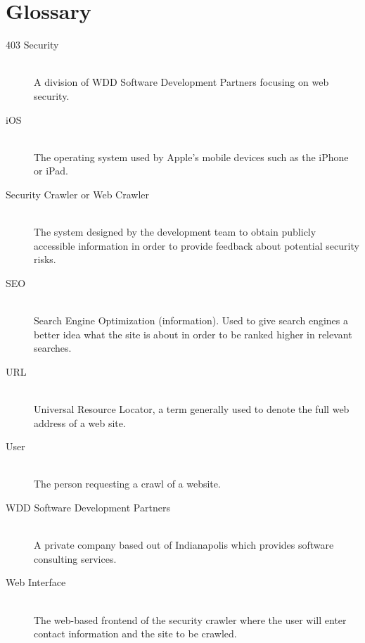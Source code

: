 \section{Glossary}
\begin{description}
    \item[403 Security] \hfill \\
        A division of WDD Software Development Partners focusing on web security.
    \item[iOS] \hfill \\
        The operating system used by Apple's mobile devices such as the iPhone or iPad.
    \item[Security Crawler or Web Crawler] \hfill \\
        The system designed by the development team to obtain publicly accessible information in order to provide feedback about potential security risks.
    \item[SEO]\hfill \\
        Search Engine Optimization (information).  Used to give search engines a better idea what the site is about in order to be ranked higher in relevant searches.
    \item[URL]\hfill \\
Universal Resource Locator, a term generally used to denote the full web address of a web site.
\item[User]\hfill \\
The person requesting a crawl of a website.
\item[WDD Software Development Partners]\hfill \\
A private company based out of Indianapolis which provides software consulting services.
\item[Web Interface] \hfill \\
The web-based frontend of the security crawler where the user will enter contact information and the site to be crawled.

\end{description}
